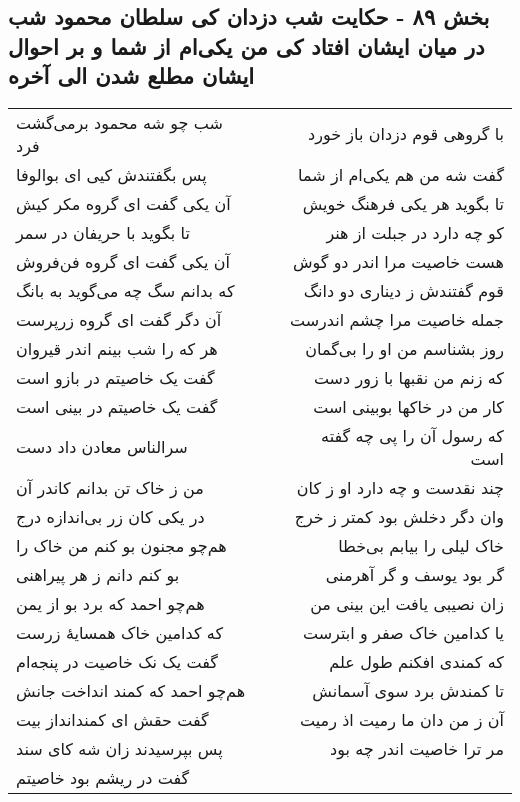 \begin{center}
\section*{بخش ۸۹ - حکایت شب دزدان کی سلطان محمود شب در میان ایشان افتاد کی من یکی‌ام از شما و بر احوال ایشان مطلع شدن الی آخره}
\label{sec:sh089}
\begin{longtable}{l p{0.5cm} r}
شب چو شه محمود برمی‌گشت فرد
&&
با گروهی قوم دزدان باز خورد
\\
پس بگفتندش کیی ای بوالوفا
&&
گفت شه من هم یکی‌ام از شما
\\
آن یکی گفت ای گروه مکر کیش
&&
تا بگوید هر یکی فرهنگ خویش
\\
تا بگوید با حریفان در سمر
&&
کو چه دارد در جبلت از هنر
\\
آن یکی گفت ای گروه فن‌فروش
&&
هست خاصیت مرا اندر دو گوش
\\
که بدانم سگ چه می‌گوید به بانگ
&&
قوم گفتندش ز دیناری دو دانگ
\\
آن دگر گفت ای گروه زرپرست
&&
جمله خاصیت مرا چشم اندرست
\\
هر که را شب بینم اندر قیروان
&&
روز بشناسم من او را بی‌گمان
\\
گفت یک خاصیتم در بازو است
&&
که زنم من نقبها با زور دست
\\
گفت یک خاصیتم در بینی است
&&
کار من در خاکها بوبینی است
\\
سرالناس معادن داد دست
&&
که رسول آن را پی چه گفته است
\\
من ز خاک تن بدانم کاندر آن
&&
چند نقدست و چه دارد او ز کان
\\
در یکی کان زر بی‌اندازه درج
&&
وان دگر دخلش بود کمتر ز خرج
\\
هم‌چو مجنون بو کنم من خاک را
&&
خاک لیلی را بیابم بی‌خطا
\\
بو کنم دانم ز هر پیراهنی
&&
گر بود یوسف و گر آهرمنی
\\
هم‌چو احمد که برد بو از یمن
&&
زان نصیبی یافت این بینی من
\\
که کدامین خاک همسایهٔ زرست
&&
یا کدامین خاک صفر و ابترست
\\
گفت یک نک خاصیت در پنجه‌ام
&&
که کمندی افکنم طول علم
\\
هم‌چو احمد که کمند انداخت جانش
&&
تا کمندش برد سوی آسمانش
\\
گفت حقش ای کمندانداز بیت
&&
آن ز من دان ما رمیت اذ رمیت
\\
پس بپرسیدند زان شه کای سند
&&
مر ترا خاصیت اندر چه بود
\\
گفت در ریشم بود خاصیتم

\end{longtable}
\end{center}
